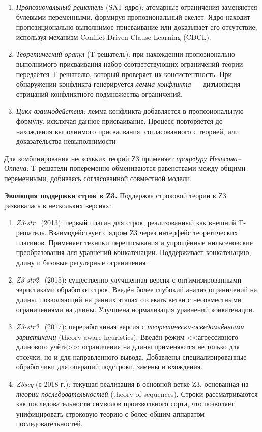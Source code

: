\documentclass[14pt, russian]{scrartcl}
\begin{document}
\begin{enumerate}
\item \emph{Пропозиональный решатель} (SAT-ядро): атомарные ограничения заменяются
  булевыми переменными, формируя пропозиональный скелет. Ядро находит пропозиционально
  выполнимое присваивание или доказывает его отсутствие, используя механизм
  Conflict-Driven Clause Learning (CDCL).
\item \emph{Теоретический оракул} (T-решатель): при нахождении пропозионально
  выполнимого присваивания набор соответствующих ограничений теории передаётся
  T-решателю, который проверяет их консистентность. При обнаружении конфликта
  генерируется \emph{лемма конфликта} --- дизъюнкция отрицаний конфликтного
  подмножества ограничений.
\item \emph{Цикл взаимодействия}: лемма конфликта добавляется в пропозиональную
  формулу, исключая данное присваивание. Процесс повторяется до нахождения
  выполнимого присваивания, согласованного с теорией, или доказательства невыполнимости.
\end{enumerate}

Для комбинирования нескольких теорий Z3 применяет \emph{процедуру Нельсона--Оппена}:
T-решатели попеременно обмениваются равенствами между общими переменными,
добиваясь согласованной совместной модели.

\medskip\noindent\textbf{Эволюция поддержки строк в Z3.}
Поддержка строковой теории в Z3 развивалась в нескольких версиях:

\begin{enumerate}
\item \emph{Z3-str}~\cite{zheng2013} (2013): первый плагин для строк, реализованный
  как внешний T-решатель. Взаимодействует с ядром Z3 через интерфейс теоретических
  плагинов. Применяет техники переписывания и упрощённые нильсеновские преобразования
  для уравнений конкатенации. Поддерживает конкатенацию, длину и базовые
  регулярные ограничения.

\item \emph{Z3-str2}~\cite{zheng2015} (2015): существенно улучшенная версия
  с оптимизированными эвристиками обработки строк. Введён более глубокий анализ
  ограничений на длины, позволяющий на ранних этапах отсекать ветви с несовместными
  ограничениями на длины. Улучшена нормализация уравнений конкатенации.

\item \emph{Z3-str3}~\cite{berzish2017} (2017): переработанная версия с
  \emph{теоретически-осведомлёнными эвристиками} (theory-aware heuristics).
  Введён режим <<агрессивного длинового учёта>>: ограничения на длины применяются
  не только для отсечки, но и для направленного вывода. Добавлены специализированные
  обработчики для операций подстроки, замены и вхождения.

\item \emph{Z3seq} (с 2018 г.): текущая реализация в основной ветке Z3, основанная
  на \emph{теории последовательностей} (theory of sequences). Строки рассматриваются
  как последовательности символов произвольного сорта, что позволяет унифицировать
  строковую теорию с более общим аппаратом последовательностей.
\end{enumerate}
\end{document}
